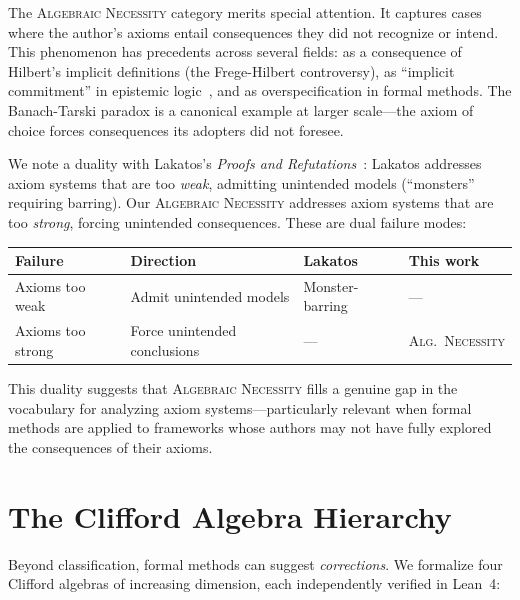 \documentclass[runningheads]{llncs}
\begin{document}
The \textsc{Algebraic Necessity} category merits special attention. It captures
cases where the author's axioms entail consequences they did not recognize or
intend. This phenomenon has precedents across several fields: as a consequence
of Hilbert's implicit definitions (the Frege-Hilbert controversy), as
``implicit commitment'' in epistemic logic~\cite{fagin1988belief}, and as
overspecification in formal methods. The Banach-Tarski paradox is a canonical
example at larger scale---the axiom of choice forces consequences its adopters
did not foresee.

We note a duality with Lakatos's \emph{Proofs and
Refutations}~\cite{lakatos1976}: Lakatos addresses axiom systems that are too
\emph{weak}, admitting unintended models (``monsters'' requiring barring). Our
\textsc{Algebraic Necessity} addresses axiom systems that are too \emph{strong},
forcing unintended consequences. These are dual failure modes:

\begin{center}
\small
\begin{tabular}{@{}llll@{}}
\toprule
\textbf{Failure} & \textbf{Direction} & \textbf{Lakatos} & \textbf{This work} \\
\midrule
Axioms too weak & Admit unintended models & Monster-barring & --- \\
Axioms too strong & Force unintended conclusions & --- & \textsc{Alg.\ Necessity} \\
\bottomrule
\end{tabular}
\end{center}

This duality suggests that \textsc{Algebraic Necessity} fills a genuine gap in
the vocabulary for analyzing axiom systems---particularly relevant when formal
methods are applied to frameworks whose authors may not have fully explored the
consequences of their axioms.

\section{The Clifford Algebra Hierarchy}
\label{sec:hierarchy}

Beyond classification, formal methods can suggest \emph{corrections}. We
formalize four Clifford algebras of increasing dimension, each independently
verified in Lean~4:
\end{document}
